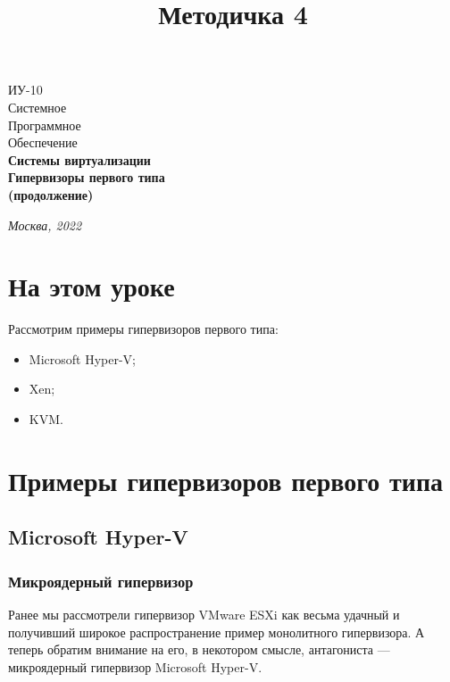 \documentclass[14pt, a4paper]{article}
\title{Методичка 4}
\begin{document}
\begin{titlepage}
    \topmargin=216pt
    \newpage
    \hangindent=0.7cm
    \huge ИУ-10\\
    Системное\\
    Программное\\
    Обеспечение\\
    \textbf{Системы виртуализации\\ 
    Гипервизоры первого типа\\(продолжение)}

    \vspace{10cm}

    \begin{center}
        \small\textit{Москва, 2022}
    \end{center}
\end{titlepage}
\section*{На этом уроке}
Рассмотрим примеры гипервизоров первого типа:
\begin{itemize}
    \item Microsoft Hyper-V;
    \item Xen;
    \item KVM.
\end{itemize}
\tableofcontents
\newpage

\section*{Примеры гипервизоров первого типа}

\subsection*{Microsoft Hyper-V}


\subsubsection*{Микроядерный гипервизор}

Ранее мы рассмотрели гипервизор VMware ESXi как весьма удачный и получивший широкое
распространение пример монолитного гипервизора. А теперь обратим внимание на его, в некотором
смысле, антагониста — микроядерный гипервизор Microsoft Hyper-V.
\end{document}

